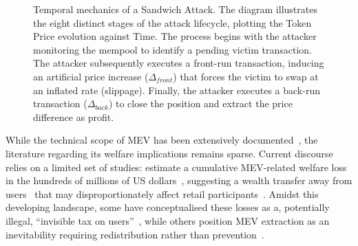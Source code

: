 \documentclass[pdflatex, sn-basic]{sn-jnl}
\theoremstyle{thmstylethree}%
\begin{document}
	\begin{figure}[t]
		\centering
		
		\caption{Temporal mechanics of a Sandwich Attack.
		The diagram illustrates the eight distinct stages of the attack lifecycle, plotting the Token Price evolution against Time.
		The process begins with the attacker monitoring the mempool to identify a pending victim transaction.
		The attacker subsequently executes a front-run transaction, inducing an artificial price increase ($\Delta_{front}$) that forces the victim to swap at an inflated rate (slippage).
		Finally, the attacker executes a back-run transaction ($\Delta_{back}$) to close the position and extract the price difference as profit.}
		\label{fig:sandwich-attack}
	\end{figure}

	While the technical scope of \ac{MEV} has been extensively documented~\citep{Heimbach2023,Alipanahloo2024,Gramlich2024,Yang2024,Materwala2025,Zhang2025}, the literature regarding its welfare implications remains sparse.
	Current discourse relies on a limited set of studies: \citet{Appiah2025} estimate a cumulative \ac{MEV}-related welfare loss in the hundreds of millions of US dollars~\citep{Appiah2025}, suggesting a wealth transfer away from users~\citep{Capponi2025} that may disproportionately affect retail participants~\citep{FerreiraTorres2021,Guidi2026}.
	Amidst this developing landscape, some have conceptualised these losses as a, potentially illegal, \enquote{invisible tax on users}~\citep{Vadlamani2024}, while others position \ac{MEV} extraction as an inevitability requiring redistribution rather than prevention~\citep{Braga2024}.


\end{document}
